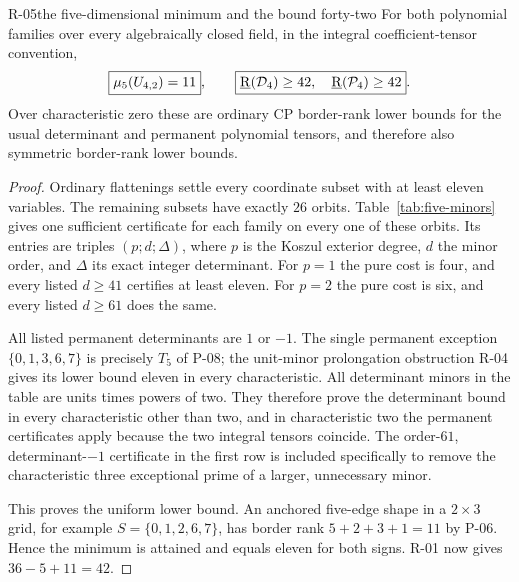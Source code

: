 \begin{finding}{R-05}{the five-dimensional minimum and the bound forty-two}
For both polynomial families over every algebraically closed
field, in the integral coefficient-tensor convention,
\[
 \boxed{\mu_5(U_{4,2})=11},\qquad
 \boxed{\underline{\mathrm R}(\mathcal D_4)\geq42,\quad
        \underline{\mathrm R}(\mathcal P_4)\geq42}.
\]
Over characteristic zero these are ordinary CP border-rank
lower bounds for the usual determinant and permanent
polynomial tensors, and therefore also symmetric
border-rank lower bounds.
\end{finding}
\begin{proof}
Ordinary flattenings settle every coordinate subset with
at least eleven variables. The remaining subsets have
exactly \(26\) orbits. Table~\ref{tab:five-minors}
gives one sufficient certificate for each family on every
one of these orbits. Its entries are triples
\((p;d;\Delta)\), where \(p\) is the Koszul exterior degree,
\(d\) the minor order, and \(\Delta\) its exact integer
determinant. For \(p=1\) the pure cost is four, and every
listed \(d\geq41\) certifies at least eleven. For \(p=2\)
the pure cost is six, and every listed \(d\geq61\)
does the same.

All listed permanent determinants are \(1\) or \(-1\).
The single permanent exception \(\{0,1,3,6,7\}\) is
precisely \(T_5\) of P-08; the unit-minor prolongation
obstruction R-04 gives its lower bound eleven in every
characteristic. All determinant minors in the table are
units times powers of two. They therefore prove the
determinant bound in every characteristic other than two,
and in characteristic two the permanent certificates apply
because the two integral tensors coincide. The
order-\(61\), determinant-\(-1\) certificate in the first
row is included specifically to remove the characteristic
three exceptional prime of a larger, unnecessary minor.

This proves the uniform lower bound. An anchored five-edge
shape in a \(2\times3\) grid, for example
\(S=\{0,1,2,6,7\}\), has border rank
\(5+2+3+1=11\) by P-06. Hence the minimum is attained and
equals eleven for both signs. R-01 now gives
\(36-5+11=42\).
\end{proof}

